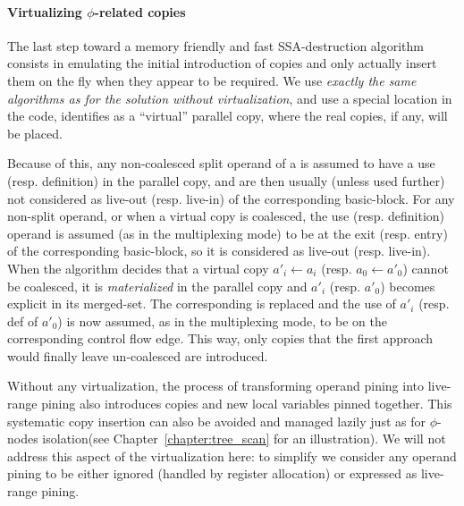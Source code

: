 \paragraph{Virtualizing $\phi$-related copies}
The last step toward a memory friendly and fast SSA-destruction algorithm consists in emulating the initial introduction of copies and only actually insert them on the fly when they appear to be required. We use \emph{exactly the same algorithms as for the solution without virtualization}, and use a special location in the code, identifies as a ``virtual'' parallel copy, where the real copies, if any, will be placed. 

Because of this, any non-coalesced split operand of a \phifun is assumed to have a use (resp. definition) in the parallel copy, and are then usually (unless used further) not considered as live-out (resp. live-in) of the corresponding basic-block. 
For any non-split operand, or when a virtual copy is coalesced, the use (resp. definition) operand is assumed (as in the multiplexing mode) to be at the exit (resp. entry) of the corresponding basic-block, so it is considered as live-out (resp. live-in). 
When the algorithm decides that a virtual copy $a'_i \gets a_i$ (resp. $a_0 \gets a'_0$)  cannot be coalesced, it is \emph{materialized} in the parallel copy and $a'_i$ (resp. $a'_0$) becomes explicit in its merged-set. 
The corresponding \phiop is replaced and the use of $a'_i$ (resp. def of $a'_0$) is now assumed, as in the multiplexing mode, to be on the corresponding control flow edge. 
This way, only copies that the first approach would finally leave un-coalesced are introduced. 


Without any virtualization, the process of transforming operand pining into live-range pining also introduces copies and new local variables pinned together. This systematic copy insertion can also be avoided and managed lazily just as for $\phi$-nodes isolation\ifhab (see Chapter~\ref{chapter:tree_scan} for an illustration)\fi. We will not address this aspect of the virtualization here: to simplify we consider any operand pining to be either ignored (handled by register allocation) or expressed as live-range pining.

